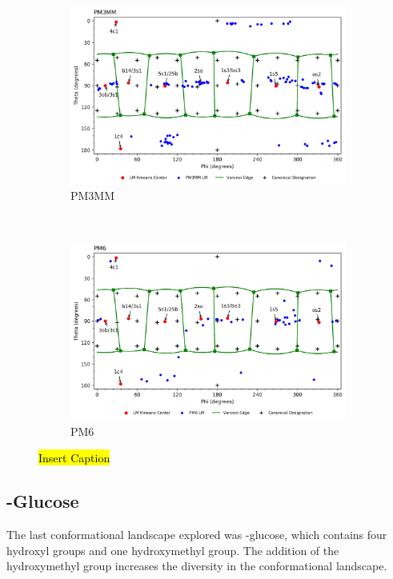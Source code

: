 \documentclass{article}
\begin{document}
\begin{figure}[H]\ContinuedFloat
	\centering
   	\begin{subfigure}[b]{0.49\textwidth}
   	\includegraphics[width=1\textwidth,keepaspectratio]
   	{figures/bxyl/overall/z_dataset-bxyl-LM-PM3MM-all_groupings.png}
   	\caption{PM3MM}
	\end{subfigure}
	~
	\begin{subfigure}[b]{0.49\textwidth}
	\includegraphics[width=1\textwidth,keepaspectratio]
   	{figures/bxyl/overall/z_dataset-bxyl-LM-PM6-all_groupings.png}
	\caption{PM6}
	\end{subfigure}
\caption{\hl{Insert Caption}}
\label{fig:bxyl-ALL-LM}
\end{figure}



\newpage 
\subsection{\textbeta-Glucose}
The last conformational landscape explored was \textbeta-glucose, which contains four hydroxyl groups and one 
hydroxymethyl group. The addition of the hydroxymethyl group increases the diversity in the conformational 
landscape.
\end{document}
